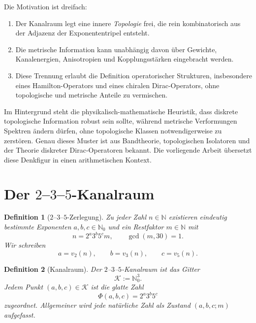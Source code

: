 \documentclass[11pt,a4paper]{article}
\newtheorem{definition}{Definition}[section]
\theoremstyle{remark}
\newcommand{\N}{\mathbb{N}}
\newcommand{\K}{\mathcal{K}}
\newcommand{\vtwo}{v_2}
\newcommand{\vthree}{v_3}
\newcommand{\vfive}{v_5}
\begin{document}
	Die Motivation ist dreifach:
	\begin{enumerate}[label=(\roman*)]
		\item Der Kanalraum legt eine innere \emph{Topologie} frei, die rein kombinatorisch aus der Adjazenz der Exponententripel entsteht.
		\item Die metrische Information kann unabhängig davon über Gewichte, Kanalenergien, Anisotropien und Kopplungsstärken eingebracht werden.
		\item Diese Trennung erlaubt die Definition operatorischer Strukturen, insbesondere eines Hamilton-Operators und eines chiralen Dirac-Operators, ohne topologische und metrische Anteile zu vermischen.
	\end{enumerate}
	
	Im Hintergrund steht die physikalisch-mathematische Heuristik, dass diskrete topologische Information robust sein sollte, während metrische Verformungen Spektren ändern dürfen, ohne topologische Klassen notwendigerweise zu zerstören. Genau dieses Muster ist aus Bandtheorie, topologischen Isolatoren und der Theorie diskreter Dirac-Operatoren bekannt. Die vorliegende Arbeit übersetzt diese Denkfigur in einen arithmetischen Kontext.
	
	\section{Der $2$--$3$--$5$-Kanalraum}
	
	\begin{definition}[$2$--$3$--$5$-Zerlegung]
		Zu jeder Zahl $n\in\N$ existieren eindeutig bestimmte Exponenten $a,b,c\in\N_0$ und ein Restfaktor $m\in\N$ mit
		\begin{equation}
			n = 2^a 3^b 5^c m,
			\qquad \gcd(m,30)=1.
		\end{equation}
		Wir schreiben
		\begin{equation}
			a=\vtwo(n),\qquad b=\vthree(n),\qquad c=\vfive(n).
		\end{equation}
	\end{definition}
	
	\begin{definition}[Kanalraum]
		Der \emph{$2$--$3$--$5$-Kanalraum} ist das Gitter
		\begin{equation}
			\K := \N_0^3.
		\end{equation}
		Jedem Punkt $(a,b,c)\in\K$ ist die glatte Zahl
		\begin{equation}
			\Phi(a,b,c)=2^a3^b5^c
		\end{equation}
		zugeordnet. Allgemeiner wird jede natürliche Zahl als Zustand $(a,b,c;m)$ aufgefasst.
	\end{definition}
	
\end{document}
